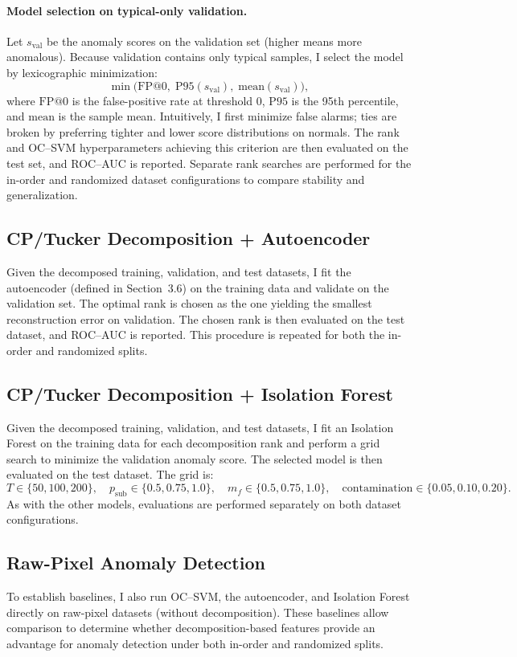 \documentclass[11pt]{article}
\begin{document}
\paragraph{Model selection on typical-only validation.}
Let \(s_{\text{val}}\) be the anomaly scores on the validation set (higher means more anomalous). Because validation contains only typical samples, I select the model by lexicographic minimization:
\[
\min \bigl(\mathrm{FP}@0,\; \mathrm{P95}(s_{\text{val}}),\; \mathrm{mean}(s_{\text{val}})\bigr),
\]
where \(\mathrm{FP}@0\) is the false-positive rate at threshold \(0\), \(\mathrm{P95}\) is the 95th percentile, and \(\mathrm{mean}\) is the sample mean. Intuitively, I first minimize false alarms; ties are broken by preferring tighter and lower score distributions on normals. The rank and OC\mbox{--}SVM hyperparameters achieving this criterion are then evaluated on the test set, and ROC--AUC is reported. Separate rank searches are performed for the in-order and randomized dataset configurations to compare stability and generalization.

\subsection{CP/Tucker Decomposition + Autoencoder}
Given the decomposed training, validation, and test datasets, I fit the autoencoder (defined in Section~3.6) on the training data and validate on the validation set. The optimal rank is chosen as the one yielding the smallest reconstruction error on validation. The chosen rank is then evaluated on the test dataset, and ROC--AUC is reported. This procedure is repeated for both the in-order and randomized splits.

\subsection{CP/Tucker Decomposition + Isolation Forest}
Given the decomposed training, validation, and test datasets, I fit an Isolation Forest on the training data for each decomposition rank and perform a grid search to minimize the validation anomaly score. The selected model is then evaluated on the test dataset. The grid is:
\[
T \in \{50,100,200\},\quad
p_{\text{sub}} \in \{0.5,0.75,1.0\},\quad
m_f \in \{0.5,0.75,1.0\},\quad
\text{contamination} \in \{0.05,0.10,0.20\}.
\]
As with the other models, evaluations are performed separately on both dataset configurations.

\subsection{Raw-Pixel Anomaly Detection}
To establish baselines, I also run OC\mbox{--}SVM, the autoencoder, and Isolation Forest directly on raw-pixel datasets (without decomposition). These baselines allow comparison to determine whether decomposition-based features provide an advantage for anomaly detection under both in-order and randomized splits.
\end{document}
